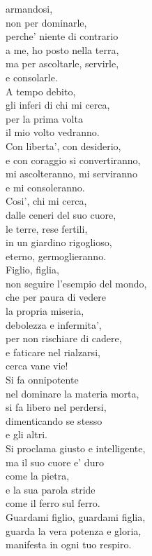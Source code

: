 \begin{haiku}
{armandosi,\\
non per dominarle, \\
perche' niente di contrario\\
a me, ho posto nella terra,\\
ma per ascoltarle, servirle,\\
e consolarle.\\
A tempo debito,\\
gli inferi di chi mi cerca,\\
per la prima volta \\
il mio volto vedranno.\\
Con liberta', con desiderio,\\
e con coraggio si convertiranno,\\
mi ascolteranno, mi serviranno\\
e mi consoleranno.\\
Cosi', chi mi cerca,\\
dalle ceneri del suo cuore,\\
le terre, rese fertili,\\
in un giardino rigoglioso,\\
eterno, germoglieranno.\\
Figlio, figlia, \\
non seguire l'esempio del mondo,\\
che per paura di vedere \\
la propria miseria, \\
debolezza e infermita', \\
per non rischiare di cadere, \\
e faticare nel rialzarsi,\\
cerca vane vie!\\
Si fa onnipotente \\
nel dominare la materia morta,\\
si fa libero nel perdersi,\\
dimenticando se stesso\\
e gli altri.\\
Si proclama giusto e intelligente,\\
ma il suo cuore e' duro\\
come la pietra,\\
e la sua parola stride \\
come il ferro sul ferro.\\
Guardami figlio, guardami figlia, \\
guarda la vera potenza e gloria,\\
manifesta in ogni tuo respiro.\\
}
\end{haiku}
